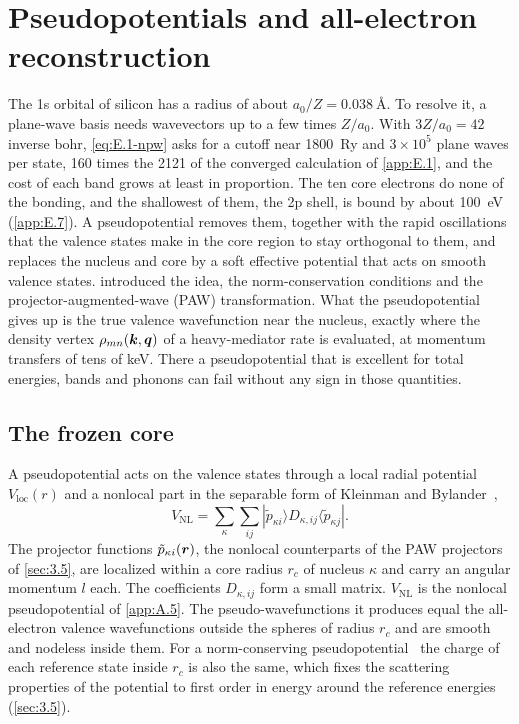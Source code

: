 \section{Pseudopotentials and all-electron reconstruction}\label{app:E.2}

The 1s orbital of silicon has a radius of about $a_0/Z = \SI{0.038}{\angstrom}$. To resolve it, a plane-wave basis needs wavevectors up to a few times $Z/a_0$. With $3Z/a_0 = 42$ inverse bohr, \cref{eq:E.1-npw} asks for a cutoff near \SI{1800}{Ry} and $3\times10^5$ plane waves per state, 160 times the 2121 of the converged calculation of \cref{app:E.1}, and the cost of each band grows at least in proportion. The ten core electrons do none of the bonding, and the shallowest of them, the 2p shell, is bound by about \SI{100}{eV} (\cref{app:E.7}). A pseudopotential removes them, together with the rapid oscillations that the valence states make in the core region to stay orthogonal to them, and replaces the nucleus and core by a soft effective potential that acts on smooth valence states.  introduced the idea, the norm-conservation conditions and the projector-augmented-wave (PAW) transformation. What the pseudopotential gives up is the true valence wavefunction near the nucleus, exactly where the density vertex $\rho_{mn}(\bm{k}, \bm{q})$ of a heavy-mediator rate is evaluated, at momentum transfers of tens of keV. There a pseudopotential that is excellent for total energies, bands and phonons can fail without any sign in those quantities.

\subsection{The frozen core}

A pseudopotential acts on the valence states through a local radial potential $V_{\mathrm{loc}}(r)$ and a nonlocal part in the separable form of Kleinman and Bylander~\cite{kleinman1982efficacious},
\begin{equation}
  V_{\mathrm{NL}} = \sum_{\kappa}\sum_{ij}|\tilde p_{\kappa i}\rangle D_{\kappa,ij}\langle\tilde p_{\kappa j}| .
  \label{eq:E.2-KB}
\end{equation}
The projector functions $\tilde p_{\kappa i}(\bm{r})$, the nonlocal counterparts of the PAW projectors of \cref{sec:3.5}, are localized within a core radius $r_c$ of nucleus $\kappa$ and carry an angular momentum $l$ each. The coefficients $D_{\kappa,ij}$ form a small matrix. $V_{\mathrm{NL}}$ is the nonlocal pseudopotential of \cref{app:A.5}. The pseudo-wavefunctions it produces equal the all-electron valence wavefunctions outside the spheres of radius $r_c$ and are smooth and nodeless inside them. For a norm-conserving pseudopotential~\cite{hamann1979norm} the charge of each reference state inside $r_c$ is also the same, which fixes the scattering properties of the potential to first order in energy around the reference energies (\cref{sec:3.5}).

